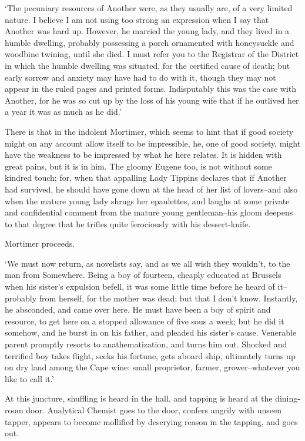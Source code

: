 ‘The pecuniary resources of Another were, as they usually are, of a very
limited nature. I believe I am not using too strong an expression when
I say that Another was hard up. However, he married the young lady, and
they lived in a humble dwelling, probably possessing a porch ornamented
with honeysuckle and woodbine twining, until she died. I must refer
you to the Registrar of the District in which the humble dwelling was
situated, for the certified cause of death; but early sorrow and anxiety
may have had to do with it, though they may not appear in the ruled
pages and printed forms. Indisputably this was the case with Another,
for he was so cut up by the loss of his young wife that if he outlived
her a year it was as much as he did.’

There is that in the indolent Mortimer, which seems to hint that if good
society might on any account allow itself to be impressible, he, one of
good society, might have the weakness to be impressed by what he here
relates. It is hidden with great pains, but it is in him. The gloomy
Eugene too, is not without some kindred touch; for, when that appalling
Lady Tippins declares that if Another had survived, he should have gone
down at the head of her list of lovers--and also when the mature young
lady shrugs her epaulettes, and laughs at some private and confidential
comment from the mature young gentleman--his gloom deepens to that
degree that he trifles quite ferociously with his dessert-knife.

Mortimer proceeds.

‘We must now return, as novelists say, and as we all wish they wouldn’t,
to the man from Somewhere. Being a boy of fourteen, cheaply educated
at Brussels when his sister’s expulsion befell, it was some little time
before he heard of it--probably from herself, for the mother was dead;
but that I don’t know. Instantly, he absconded, and came over here. He
must have been a boy of spirit and resource, to get here on a stopped
allowance of five sous a week; but he did it somehow, and he burst in
on his father, and pleaded his sister’s cause. Venerable parent promptly
resorts to anathematization, and turns him out. Shocked and terrified
boy takes flight, seeks his fortune, gets aboard ship, ultimately
turns up on dry land among the Cape wine: small proprietor, farmer,
grower--whatever you like to call it.’

At this juncture, shuffling is heard in the hall, and tapping is heard
at the dining-room door. Analytical Chemist goes to the door, confers
angrily with unseen tapper, appears to become mollified by descrying
reason in the tapping, and goes out.

